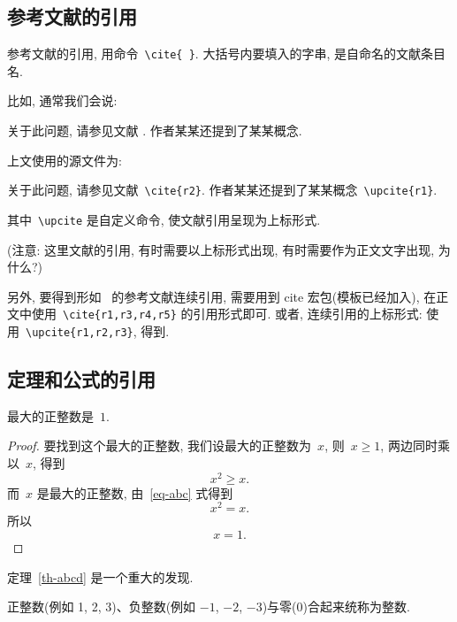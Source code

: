 \documentclass{WHUMaster}   %
\begin{document}
\subsection{参考文献的引用}

参考文献的引用, 用命令~\verb|\cite{ }|. 大括号内要填入的字串, 是自命名的文献条目名.

比如, 通常我们会说:

 {\kaishu
关于此问题, 请参见文献 \cite{r2}. 作者某某还提到了某某概念.}


上文使用的源文件为:

 {\kaishu
关于此问题, 请参见文献~\verb|\cite{r2}|. 作者某某还提到了某某概念~\verb|\upcite{r1}|.
}

其中~\verb|\upcite| 是自定义命令, 使文献引用呈现为上标形式.

({\heiti 注意:} {\kaishu 这里文献的引用, 有时需要以上标形式出现, 有时需要作为正文文字出现, 为什么?})

另外, 要得到形如~\cite{r1,r3,r4,r5} 的参考文献连续引用, 需要用到 cite 宏包(模板已经加入),
在正文中使用~\verb|\cite{r1,r3,r4,r5}| 的引用形式即可.
或者, 连续引用的上标形式: 使用~\verb|\upcite{r1,r2,r3}|, 得到.

\subsection{定理和公式的引用}

\begin{theorem}[谁发现的]\label{th-abcd}
最大的正整数是~$1$.
\end{theorem}

\begin{proof}
要找到这个最大的正整数, 我们设最大的正整数为~$x$, 则~$x \geqslant 1$, 两边同时乘以~$x$, 得到
\begin{equation}\label{eq-abc}
x^2 \geqslant x.
\end{equation}
而~$x$ 是最大的正整数, 由~\eqref{eq-abc} 式得到
\[
x^2 = x.
\]
所以
\begin{equation*}
x = 1.
\end{equation*}
\end{proof}

定理~\ref{th-abcd} 是一个重大的发现.

\begin{definition}[整数]
 正整数(例如 1, 2, 3)、负整数(例如 ${−1}$, $−2$, $−3$)与零(0)合起来统称为{\heiti 整数}.
\end{definition}
\end{document}
